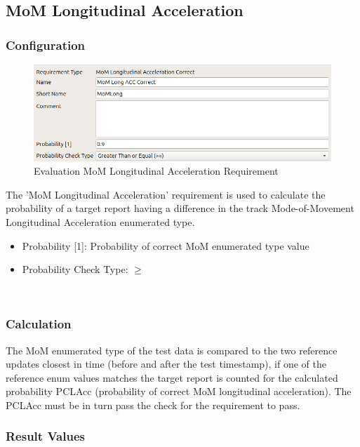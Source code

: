 \subsection{MoM Longitudinal Acceleration}
\label{sec:eval_req_mom_long}

\subsubsection{Configuration}

\begin{figure}[H]
    \includegraphics[width=14cm,frame]{figures/eval_req_mom_long.png}
  \caption{Evaluation MoM Longitudinal Acceleration Requirement}
\end{figure}

The 'MoM Longitudinal Acceleration’ requirement is used to calculate the probability of a target report having a difference in the track Mode-of-Movement Longitudinal Acceleration enumerated type. 

\begin{itemize}  
\item Probability [1]: Probability of correct MoM enumerated type value
\item Probability Check Type: $\geq$
\end{itemize}
\ \\

\subsubsection{Calculation}

The MoM enumerated type of the test data is compared to the two reference updates closest in time (before and after the test timestamp), if one of the reference enum values matches the target report is counted for the calculated probability PCLAcc (probability of correct MoM longitudinal acceleration). The PCLAcc must be in turn pass the check for the requirement to pass. 

\subsubsection{Result Values}

